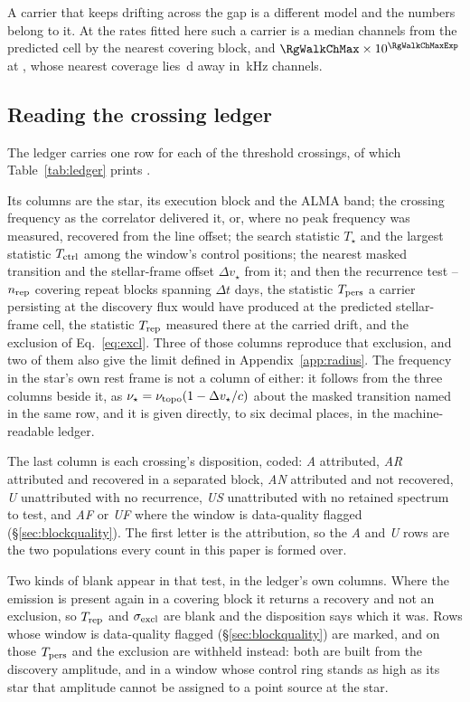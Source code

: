 A carrier that keeps drifting across the gap is a different model and the
numbers belong to it. At the rates fitted here such a carrier is a median
\RgWalkChMed{} channels from the predicted cell by the nearest covering
block, and $\RgWalkChMax\times10^{\RgWalkChMaxExp}$ at \RgWalkStar, whose
nearest coverage lies \RgWalkGapD\,d away in \RgWalkChanKHz\,kHz channels.

\subsection{Reading the crossing ledger}
\label{sec:ledgercolumns}

The ledger carries one row for each of the \EvNCrossRaw{} threshold
crossings, of which Table~\ref{tab:ledger} prints \SiLdgSampN.

Its columns are the star, its execution block and
the ALMA band; the crossing frequency as the correlator delivered it, or,
where no peak frequency was measured, recovered from the line offset; the
search statistic $T_\star$ and
the largest statistic $T_{\rm ctrl}$ among the window's \NCtrl{} control
positions; the nearest masked transition and the stellar-frame offset
$\Delta v_\star$ from it; and then the recurrence test -- $n_{\rm rep}$
covering repeat blocks spanning $\Delta t$ days, the statistic $T_{\rm pers}$
a carrier persisting at the discovery flux would have produced at the
predicted stellar-frame cell, the statistic $T_{\rm rep}$ measured there at
the carried drift, and the exclusion of Eq.~\ref{eq:excl}. Three of those
columns reproduce that exclusion, and two of them also give the limit defined
in Appendix~\ref{app:radius}. The
frequency in the star's own rest frame is
not a column of either: it follows from the three columns beside
it, as $\nu_\star=\nu_{\rm topo}(1-\Delta v_\star/c)$ about the masked
transition named in the same row, and it is given directly, to six decimal
places, in the machine-readable ledger.

The last column is each crossing's disposition, coded: \emph{A} attributed,
\emph{AR} attributed and recovered in a separated block, \emph{AN}
attributed and not recovered, \emph{U} unattributed with no recurrence,
\emph{US} unattributed with no retained spectrum to test, and \emph{AF} or
\emph{UF} where the window is data-quality flagged
(\S\ref{sec:blockquality}). The first letter is the attribution, so the
\emph{A} and \emph{U} rows are the two populations every count in this paper
is formed over.

Two kinds of blank appear in that test, in the ledger's own columns. Where the
emission is present again in
a covering block it returns a recovery and not an exclusion, so
$T_{\rm rep}$ and $\sigma_{\rm excl}$ are blank and the disposition says which
it was. Rows whose window is data-quality flagged
(\S\ref{sec:blockquality}) are marked, and on those $T_{\rm pers}$ and the
exclusion are withheld instead: both are built from the discovery amplitude,
and in a window whose control ring stands as high as its star that amplitude
cannot be assigned to a point source at the star.

